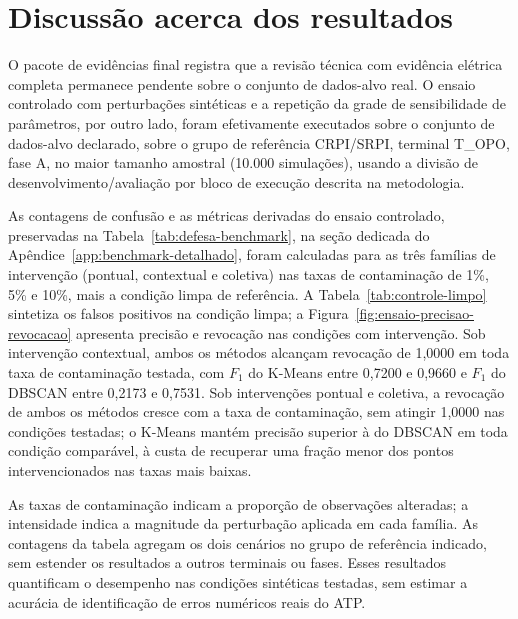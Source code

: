 \documentclass[
	12pt,				%
	openright,			%
	oneside,			%
	a4paper,			%
	chapter=TITLE,		%
	section=TITLE,		%
	subsection=TITLE,	%
	subsubsection=TITLE,%
	english,			%
	brazilian			%
	]{abntex2}
\theoremstyle{definition}
\begin{document}
\section{Discussão acerca dos resultados}
\label{sec:discussao-resultados}
\label{sec:avaliacao-controlada}
\label{sec:alcance-limitacoes}
\label{sec:lacunas-pacote}

O pacote de evidências final registra que a revisão
técnica com evidência elétrica completa permanece pendente sobre o conjunto
de dados-alvo real. O ensaio controlado com perturbações sintéticas e a
repetição da grade de sensibilidade de parâmetros, por outro lado, foram
efetivamente executados sobre o conjunto de dados-alvo declarado, sobre o
grupo de referência CRPI/SRPI, terminal T\_OPO, fase A, no maior tamanho
amostral (10.000 simulações), usando a divisão de desenvolvimento/avaliação
por bloco de execução descrita na metodologia.

As contagens de confusão e as métricas derivadas do ensaio controlado,
preservadas na Tabela~\ref{tab:defesa-benchmark}, na seção dedicada do
Apêndice~\ref{app:benchmark-detalhado}, foram calculadas para as três famílias de
intervenção (pontual, contextual e coletiva) nas taxas de contaminação de
1\%, 5\% e 10\%, mais a condição limpa de referência. A
Tabela~\ref{tab:controle-limpo} sintetiza os falsos positivos na condição
limpa; a Figura~\ref{fig:ensaio-precisao-revocacao} apresenta precisão e
revocação nas condições com intervenção. Sob
intervenção contextual, ambos os métodos alcançam revocação de 1,0000 em
toda taxa de contaminação testada, com $F_1$ do K-Means entre 0,7200 e
0,9660 e $F_1$ do DBSCAN entre 0,2173 e 0,7531. Sob intervenções pontual e
coletiva, a revocação de ambos os métodos cresce com a taxa de
contaminação, sem atingir 1,0000 nas condições testadas; o K-Means mantém
precisão superior à do DBSCAN em toda condição comparável, à custa de
recuperar uma fração menor dos pontos intervencionados nas taxas mais
baixas.

As taxas de contaminação indicam a proporção de observações alteradas;
a intensidade indica a magnitude da perturbação aplicada em cada família.
As contagens da tabela agregam os dois cenários no grupo de referência
indicado, sem estender os resultados a outros terminais ou fases. Esses
resultados quantificam o desempenho nas condições sintéticas testadas,
sem estimar a acurácia de identificação de erros numéricos reais do ATP.
\end{document}
